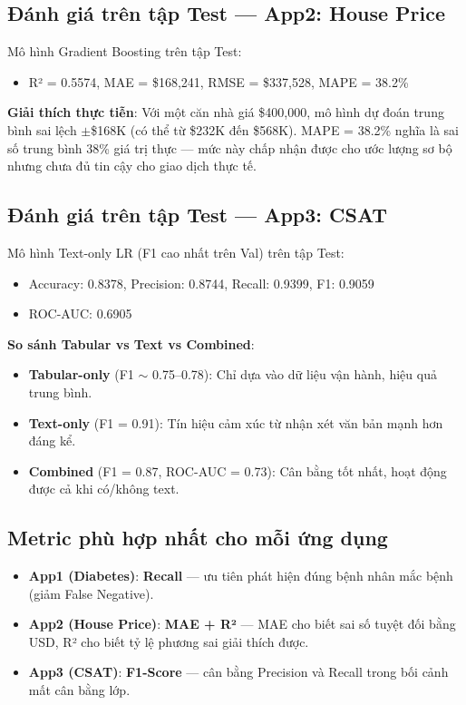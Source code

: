 \documentclass[12pt, a4paper]{article}
\begin{document}
\subsection{Đánh giá trên tập Test — App2: House Price}

Mô hình Gradient Boosting trên tập Test:
\begin{itemize}
    \item R² = 0.5574, MAE = \$168,241, RMSE = \$337,528, MAPE = 38.2\%
\end{itemize}

\textbf{Giải thích thực tiễn}: Với một căn nhà giá \$400,000, mô hình dự đoán trung bình sai lệch $\pm$\$168K (có thể từ \$232K đến \$568K). MAPE = 38.2\% nghĩa là sai số trung bình 38\% giá trị thực — mức này chấp nhận được cho ước lượng sơ bộ nhưng chưa đủ tin cậy cho giao dịch thực tế.

\subsection{Đánh giá trên tập Test — App3: CSAT}

Mô hình Text-only LR (F1 cao nhất trên Val) trên tập Test:
\begin{itemize}
    \item Accuracy: 0.8378, Precision: 0.8744, Recall: 0.9399, F1: 0.9059
    \item ROC-AUC: 0.6905
\end{itemize}

\textbf{So sánh Tabular vs Text vs Combined}:
\begin{itemize}
    \item \textbf{Tabular-only} (F1 $\sim$ 0.75--0.78): Chỉ dựa vào dữ liệu vận hành, hiệu quả trung bình.
    \item \textbf{Text-only} (F1 = 0.91): Tín hiệu cảm xúc từ nhận xét văn bản mạnh hơn đáng kể.
    \item \textbf{Combined} (F1 = 0.87, ROC-AUC = 0.73): Cân bằng tốt nhất, hoạt động được cả khi có/không text.
\end{itemize}

\subsection{Metric phù hợp nhất cho mỗi ứng dụng}

\begin{itemize}
    \item \textbf{App1 (Diabetes)}: \textbf{Recall} — ưu tiên phát hiện đúng bệnh nhân mắc bệnh (giảm False Negative).
    \item \textbf{App2 (House Price)}: \textbf{MAE + R²} — MAE cho biết sai số tuyệt đối bằng USD, R² cho biết tỷ lệ phương sai giải thích được.
    \item \textbf{App3 (CSAT)}: \textbf{F1-Score} — cân bằng Precision và Recall trong bối cảnh mất cân bằng lớp.
\end{itemize}
\end{document}
